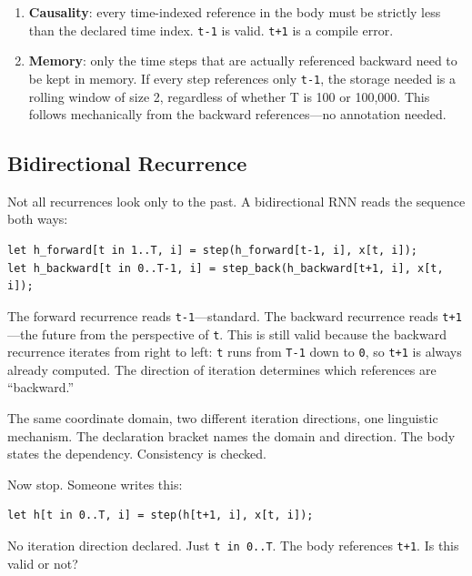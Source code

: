 \documentclass[11pt,titlepage]{article}
\providecommand{\tightlist}{%
  \setlength{\itemsep}{0pt}\setlength{\parskip}{0pt}}
\begin{document}
\begin{enumerate}
\def\labelenumi{\arabic{enumi}.}
\tightlist
\item
  \textbf{Causality}: every time-indexed reference in the body must be
  strictly less than the declared time index. \texttt{t-1} is valid.
  \texttt{t+1} is a compile error.
\item
  \textbf{Memory}: only the time steps that are actually referenced
  backward need to be kept in memory. If every step references only
  \texttt{t-1}, the storage needed is a rolling window of size 2,
  regardless of whether T is 100 or 100,000. This follows mechanically
  from the backward references---no annotation needed.
\end{enumerate}

\vspace{2em}

\hypertarget{bidirectional-recurrence}{%
\subsection{Bidirectional Recurrence}\label{bidirectional-recurrence}}

Not all recurrences look only to the past. A bidirectional RNN reads the
sequence both ways:

\begin{verbatim}
let h_forward[t in 1..T, i] = step(h_forward[t-1, i], x[t, i]);
let h_backward[t in 0..T-1, i] = step_back(h_backward[t+1, i], x[t, i]);
\end{verbatim}

The forward recurrence reads \texttt{t-1}---standard. The backward
recurrence reads \texttt{t+1}---the future from the perspective of
\texttt{t}. This is still valid because the backward recurrence iterates
from right to left: \texttt{t} runs from \texttt{T-1} down to
\texttt{0}, so \texttt{t+1} is always already computed. The direction of
iteration determines which references are ``backward.''

The same coordinate domain, two different iteration directions, one
linguistic mechanism. The declaration bracket names the domain and
direction. The body states the dependency. Consistency is checked.

Now stop. Someone writes this:

\begin{verbatim}
let h[t in 0..T, i] = step(h[t+1, i], x[t, i]);
\end{verbatim}

No iteration direction declared. Just \texttt{t\ in\ 0..T}. The body
references \texttt{t+1}. Is this valid or not?
\end{document}
